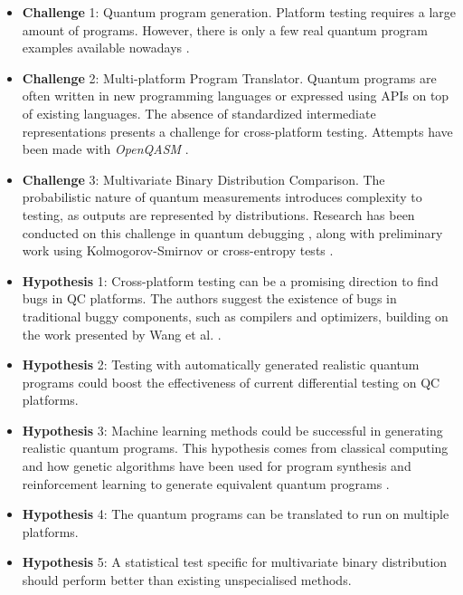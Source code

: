 \begin{itemize}
\vspace{-10pt}
\begin{itemize}
    \item[] \textbf{Challenge} 1: Quantum program generation. Platform testing requires a large amount of programs. However, there is only a few real quantum program examples available nowadays \cite{campos2021qbugs}.
    \item[] \textbf{Challenge} 2: Multi-platform Program Translator. Quantum programs are often written in new programming languages or expressed using APIs on top of existing languages. The absence of standardized intermediate representations presents a challenge for cross-platform testing. Attempts have been made with \textit{OpenQASM} \cite{cross2017open}\cite{cross2022openqasm}.
    \item[] \textbf{Challenge} 3: Multivariate Binary Distribution Comparison. The probabilistic nature of quantum measurements introduces complexity to testing, as outputs are represented by distributions. Research has been conducted on this challenge in quantum debugging \cite{huang2018qdb}\cite{huang2019statistical}\cite{li2020projection} , along with preliminary work using Kolmogorov-Smirnov or cross-entropy tests \cite{wang2021qdiff}.
\end{itemize}

\vspace{-10pt}
\begin{itemize}
    \item[] \textbf{Hypothesis} 1: Cross-platform testing can be a promising direction to find bugs in QC platforms. The authors suggest the existence of bugs in traditional buggy components, such as compilers and optimizers, building on the work presented by Wang et al. \cite{wang2021qdiff}.
    \item[] \textbf{Hypothesis} 2: Testing with automatically generated realistic quantum programs could boost the effectiveness of current differential testing on QC platforms.
    \item[] \textbf{Hypothesis} 3: Machine learning methods could be successful in generating realistic quantum programs. This hypothesis comes from classical computing and how genetic algorithms have been used for program synthesis \cite{koza1994genetic} and reinforcement learning to generate equivalent quantum programs \cite{moro2021quantum}.
    \item[] \textbf{Hypothesis} 4: The quantum programs can be translated to run on multiple platforms.
    \item[] \textbf{Hypothesis} 5: A statistical test specific for multivariate binary distribution should perform better than existing unspecialised methods.
\end{itemize}


\end{itemize}
